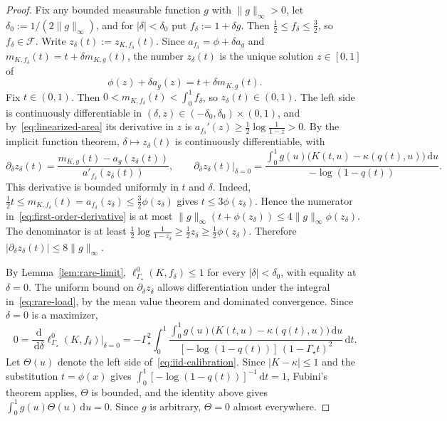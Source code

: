 \documentclass[11pt]{article}
\theoremstyle{definition}
\theoremstyle{remark}
\newcommand{\dd}{\,\mathrm d}
\begin{document}
\begin{proof}
Fix any bounded measurable function $g$ with $\|g\|_\infty>0$, let $\delta_0:=1/(2\|g\|_\infty)$, and for $|\delta|<\delta_0$ put $f_\delta:=1+\delta g$.
Then $\frac12\le f_\delta\le\frac32$, so $f_\delta\in\mathcal F$.
Write $z_\delta(t):=z_{K,f_\delta}(t)$.
Since $a_{f_\delta}=\phi+\delta a_g$ and $m_{K,f_\delta}(t)=t+\delta m_{K,g}(t)$, the number $z_\delta(t)$ is the unique solution $z\in[0,1]$ of
\[
 \phi(z)+\delta a_g(z)=t+\delta m_{K,g}(t).
\]
Fix $t\in(0,1)$.
Then $0<m_{K,f_\delta}(t)<\int_0^1f_\delta$, so $z_\delta(t)\in(0,1)$.
The left side is continuously differentiable in $(\delta,z)\in(-\delta_0,\delta_0)\times(0,1)$, and by~\eqref{eq:linearized-area} its derivative in $z$ is $a_{f_\delta}'(z)\ge\frac12\log\frac1{1-z}>0$.
By the implicit function theorem, $\delta\mapsto z_\delta(t)$ is continuously differentiable, with
\begin{equation}\label{eq:first-order-derivative}
 \partial_\delta z_\delta(t)
 =\frac{m_{K,g}(t)-a_g(z_\delta(t))}{a'_{f_\delta}(z_\delta(t))},
 \qquad
 \partial_\delta z_\delta(t)\big|_{\delta=0}
 =\frac{\int_0^1g(u)\bigl(K(t,u)-\kappa(q(t),u)\bigr)\dd u}{-\log(1-q(t))}.
\end{equation}
This derivative is bounded uniformly in $t$ and $\delta$.
Indeed, $\frac12t\le m_{K,f_\delta}(t)=a_{f_\delta}(z_\delta)\le\frac32\phi(z_\delta)$ gives $t\le3\phi(z_\delta)$.
Hence the numerator in~\eqref{eq:first-order-derivative} is at most $\|g\|_\infty(t+\phi(z_\delta))\le4\|g\|_\infty\phi(z_\delta)$.
The denominator is at least $\frac12\log\frac1{1-z_\delta}\ge\frac12z_\delta\ge\frac12\phi(z_\delta)$.
Therefore $|\partial_\delta z_\delta(t)|\le8\|g\|_\infty$.

By Lemma~\ref{lem:rare-limit}, $\ell^{0}_{\Gamma_\star}(K,f_\delta)\le1$ for every $|\delta|<\delta_0$, with equality at $\delta=0$.
The uniform bound on $\partial_\delta z_\delta$ allows differentiation under the integral in~\eqref{eq:rare-load}, by the mean value theorem and dominated convergence.
Since $\delta=0$ is a maximizer,
\[
 0=\frac{\dd}{\dd\delta}\ell^{0}_{\Gamma_\star}(K,f_\delta)\Big|_{\delta=0}
 =-\Gamma_\star^2\int_0^1
 \frac{\int_0^1g(u)\bigl(K(t,u)-\kappa(q(t),u)\bigr)\dd u}
 {[-\log(1-q(t))]\,(1-\Gamma_\star t)^2}\dd t.
\]
Let $\Theta(u)$ denote the left side of~\eqref{eq:iid-calibration}.
Since $|K-\kappa|\le1$ and the substitution $t=\phi(x)$ gives $\int_0^1[-\log(1-q(t))]^{-1}\dd t=1$, Fubini's theorem applies, $\Theta$ is bounded, and the identity above gives $\int_0^1g(u)\Theta(u)\dd u=0$.
Since $g$ is arbitrary, $\Theta=0$ almost everywhere.
\end{proof}
\end{document}
